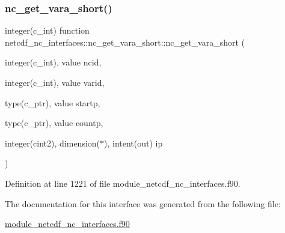 \subsubsection{\texorpdfstring{nc\+\_\+get\+\_\+vara\+\_\+short()}{nc\_get\_vara\_short()}}
{\footnotesize\ttfamily integer(c\+\_\+int) function netcdf\+\_\+nc\+\_\+interfaces\+::nc\+\_\+get\+\_\+vara\+\_\+short\+::nc\+\_\+get\+\_\+vara\+\_\+short (\begin{DoxyParamCaption}\item[{integer(c\+\_\+int), value}]{ncid,  }\item[{integer(c\+\_\+int), value}]{varid,  }\item[{type(c\+\_\+ptr), value}]{startp,  }\item[{type(c\+\_\+ptr), value}]{countp,  }\item[{integer(cint2), dimension($\ast$), intent(out)}]{ip }\end{DoxyParamCaption})}



Definition at line 1221 of file module\+\_\+netcdf\+\_\+nc\+\_\+interfaces.\+f90.



The documentation for this interface was generated from the following file\+:\begin{DoxyCompactItemize}
\item 
\hyperlink{module__netcdf__nc__interfaces_8f90}{module\+\_\+netcdf\+\_\+nc\+\_\+interfaces.\+f90}\end{DoxyCompactItemize}
